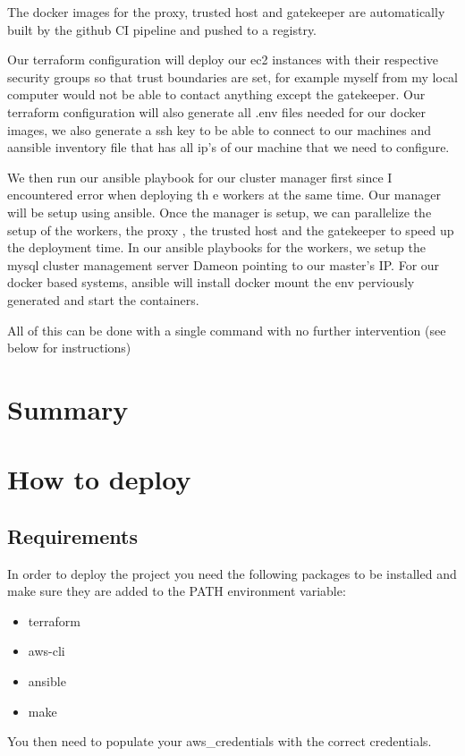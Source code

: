 \documentclass[11pt]{article}
\begin{document}
The docker images for the proxy, trusted host and gatekeeper are automatically built by the github CI pipeline and pushed to a registry.

Our terraform configuration will deploy our ec2 instances with their respective security groups so that trust boundaries are set, for example myself from my local computer would not be able to contact anything except the gatekeeper. Our terraform configuration will also generate all .env files needed for our docker images, we also generate a ssh key to be able to connect to our machines and aansible inventory file that has all ip's of our machine that we need to configure.

We then run our ansible playbook for our cluster manager first since I encountered error when deploying th e workers at the same time. Our manager will be setup using ansible. Once the manager is setup, we can parallelize the setup of the workers, the proxy , the trusted host and the gatekeeper to speed up the deployment time. In our ansible playbooks for the workers, we setup the mysql cluster management server Dameon pointing to our master's IP. For our docker based systems, ansible will install docker mount the env perviously generated and start the containers.

All of this can be done with a single command with no further intervention (see below for instructions)

\section{Summary}

\section{How to deploy}
\subsection{Requirements}
In order to deploy the project you need the following packages to be installed and make sure they are added to the PATH environment variable:

\begin{itemize}
	\item terraform
	\item aws-cli
	\item ansible
	\item make
\end{itemize}

\newline
\noindent
You then need to populate your aws\_credentials with the correct credentials.
\end{document}
